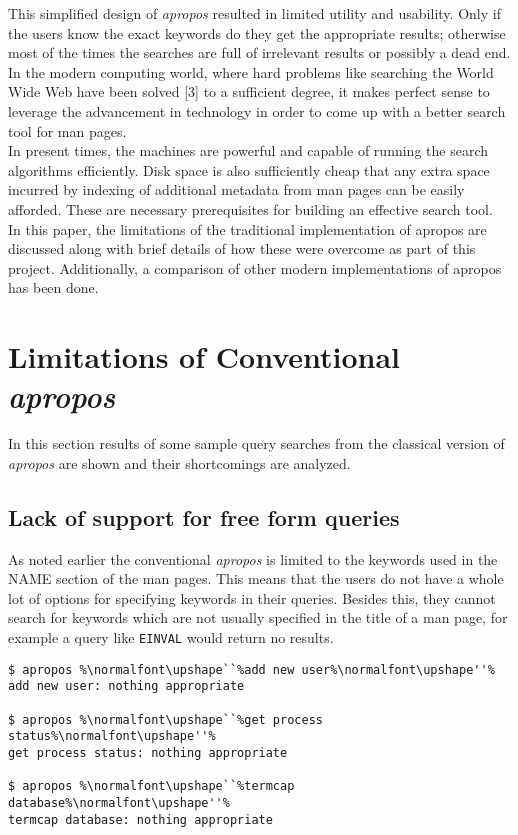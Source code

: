 \documentclass[letterpaper,twocolumn,10pt]{article}
\begin{document}
This simplified design of \textit{apropos} resulted in limited utility and
usability. Only if the users know the exact keywords do they get
the appropriate results; otherwise most of
the times the searches are full of irrelevant results or possibly a dead end. 
In the modern
computing world, where hard problems like searching the World Wide Web have been
solved [3] to a sufficient degree, it makes perfect sense to leverage the
advancement in technology in order to come up with a better search tool for
man pages. \\

In present times, the machines are powerful and  capable of running the search
algorithms efficiently. Disk
space is also sufficiently cheap that any extra space incurred by indexing of
additional metadata from man pages
can be easily afforded. These are necessary prerequisites for building an
effective search tool. \\

In this paper, the limitations of the traditional implementation of apropos
are discussed along with brief details of how these were overcome as part of
this project. Additionally, a comparison of other modern implementations of apropos has been done. \\

\section{Limitations of Conventional \textit{apropos}}
In this section results of some sample query searches from
the classical version of \textit{apropos} are shown and their shortcomings are
analyzed. \\

\subsection{Lack of support for free form queries}
As noted earlier the conventional \textit{apropos} is limited to the keywords
used in the NAME section of the man pages. This means that the users do not have
a whole lot of options for specifying keywords in their queries. Besides this,
they cannot search for keywords which are not usually specified in the title of
a man page, for example a query like {\tt EINVAL} would return no results. \\

{\small
{}
\begin{lstlisting}
$ apropos %\normalfont\upshape``%add new user%\normalfont\upshape''%
add new user: nothing appropriate

$ apropos %\normalfont\upshape``%get process status%\normalfont\upshape''%
get process status: nothing appropriate

$ apropos %\normalfont\upshape``%termcap database%\normalfont\upshape''%
termcap database: nothing appropriate
\end{lstlisting}
}
\end{document}

